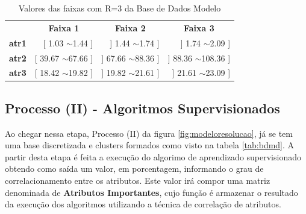 \begin{table}[]
\centering
\caption{Valores das faixas com R=3 da Base de Dados Modelo}
\label{tab:faixas}
\begin{tabular}{lrrr}
\rowcolor[HTML]{C0C0C0} 
                                     & \multicolumn{1}{c}{\cellcolor[HTML]{C0C0C0}\textbf{Faixa 1}} & \multicolumn{1}{c}{\cellcolor[HTML]{C0C0C0}\textbf{Faixa 2}} & \multicolumn{1}{c}{\cellcolor[HTML]{C0C0C0}\textbf{Faixa 3}} \\
\rowcolor[HTML]{FFFFFF} 
{\color[HTML]{333333} \textbf{atr1}} & {[} 1.03 $\sim$1.44 {]}                                      & {]} 1.44 $\sim$1.74 {]}                                      & {]} 1.74 $\sim$2.09 {]}                                      \\
\rowcolor[HTML]{EFEFEF} 
{\color[HTML]{000000} \textbf{atr2}} & {\color[HTML]{000000} {[} 39.67 $\sim$67.66 {]}}             & {\color[HTML]{000000} {]} 67.66 $\sim$88.36 {]}}             & {\color[HTML]{000000} {]} 88.36 $\sim$108.36 {]}}            \\
\rowcolor[HTML]{FFFFFF} 
\textbf{atr3}                        & {[} 18.42 $\sim$19.82 {]}                                    & {]} 19.82 $\sim$21.61 {]}                                    & {]} 21.61 $\sim$23.09 {]}                                   
\end{tabular}
\end{table}



\subsection{Processo (II) - Algoritmos Supervisionados}\label{cap:ferramentas:ssec:algsuper}

Ao chegar nessa etapa, Processo (II) da figura \ref{fig:modeloresolucao}, já se tem uma base discretizada e clusters formados como visto na tabela \ref{tab:bdmd}. A partir desta etapa é feita a execução do algorimo de aprendizado supervisionado obtendo como saída um valor, em porcentagem, informando o grau de correlacionamento entre os atributos. Este valor irá compor uma matriz denominada de \textbf{Atributos Importantes}, cujo função é armazenar o resultado da execução dos algoritmos utilizando a técnica de correlação de atributos.

